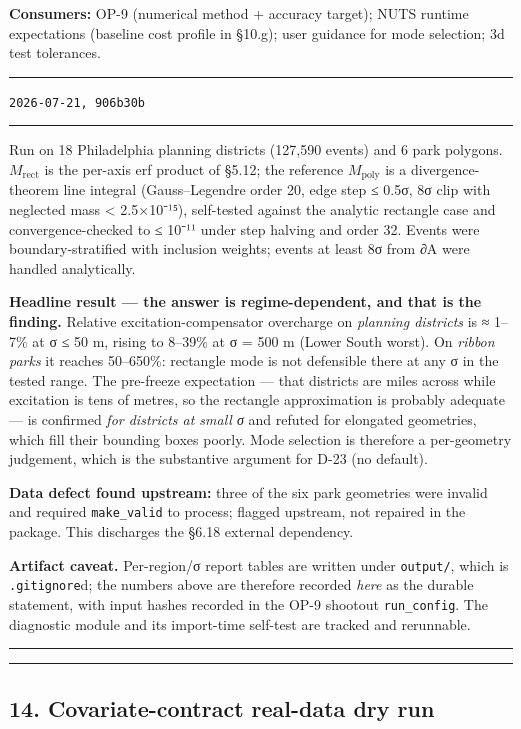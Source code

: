 \documentclass[
  10pt,
]{article}
\newenvironment{amendment}[2]{%
  \par\medskip\noindent
  {\color{amdcolor}\rule{\linewidth}{1pt}}\par\nobreak
  \vspace{-0.45\baselineskip}
  \noindent{\color{amdcolor}\textbf{#1}}\hfill{\color{amdcolor}\small\texttt{#2}}\par\nobreak
  \vspace{-0.35\baselineskip}
  {\color{amdcolor}\rule{\linewidth}{0.4pt}}\par\nobreak\smallskip
}{%
  \par\nobreak\vspace{-0.25\baselineskip}
  {\color{amdcolor}\rule{\linewidth}{1pt}}\par\medskip
}
\begin{document}
\textbf{Consumers:} OP-9 (numerical method + accuracy target); NUTS runtime expectations (baseline cost profile in §10.g); user guidance for mode selection; 3d test tolerances.

\begin{amendment}{A-8 --- §13 executed; results}{2026-07-21, \texttt{906b30b}}
Run on 18 Philadelphia planning districts (127{,}590 events) and 6 park polygons. \(M_{\mathrm{rect}}\) is the per-axis erf product of §5.12; the reference \(M_{\mathrm{poly}}\) is a divergence-theorem line integral (Gauss--Legendre order 20, edge step ≤ 0.5σ, 8σ clip with neglected mass < 2.5×10⁻¹⁵), self-tested against the analytic rectangle case and convergence-checked to ≤ 10⁻¹¹ under step halving and order 32. Events were boundary-stratified with inclusion weights; events at least 8σ from ∂A were handled analytically.

\textbf{Headline result --- the answer is regime-dependent, and that is the finding.} Relative excitation-compensator overcharge on \emph{planning districts} is ≈ 1--7\% at σ ≤ 50 m, rising to 8--39\% at σ = 500 m (Lower South worst). On \emph{ribbon parks} it reaches 50--650\%: rectangle mode is not defensible there at any σ in the tested range. The pre-freeze expectation --- that districts are miles across while excitation is tens of metres, so the rectangle approximation is probably adequate --- is confirmed \emph{for districts at small σ} and refuted for elongated geometries, which fill their bounding boxes poorly. Mode selection is therefore a per-geometry judgement, which is the substantive argument for D-23 (no default).

\textbf{Data defect found upstream:} three of the six park geometries were invalid and required \texttt{make\_valid} to process; flagged upstream, not repaired in the package. This discharges the §6.18 external dependency.

\textbf{Artifact caveat.} Per-region/σ report tables are written under \texttt{output/}, which is \texttt{.gitignore}d; the numbers above are therefore recorded \emph{here} as the durable statement, with input hashes recorded in the OP-9 shootout \texttt{run\_config}. The diagnostic module and its import-time self-test are tracked and rerunnable.
\end{amendment}

\begin{center}\rule{0.5\linewidth}{0.5pt}\end{center}

\hypertarget{covariate-contract-real-data-dry-run}{%
\subsection{14. Covariate-contract real-data dry run}\label{covariate-contract-real-data-dry-run}}
\end{document}
